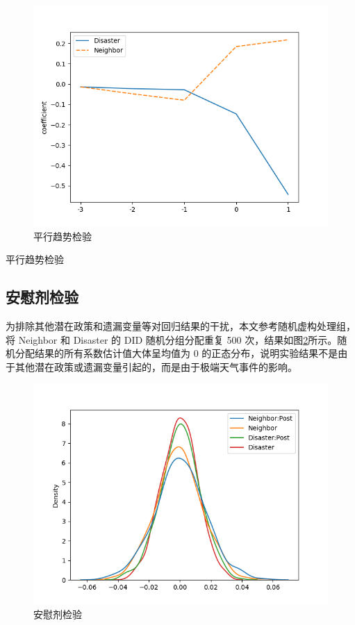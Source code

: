 \begin{figure}[H]
    \includegraphics[width=\linewidth]{lib/img/robust.png}
    \caption{平行趋势检验}\label{fig:robust}
\end{figure}
\begin{table}[H]
    \centering
    \caption{平行趋势检验}\label{tab:robust}
    
\end{table}

\subsection{安慰剂检验}
为排除其他潜在政策和遗漏变量等对回归结果的干扰，本文参考\citet{CYJJ202104009}随机虚构处理组，将 Neighbor 和 Disaster 的 DID 随机分组分配重复 500 次，结果如图\ref{fig:randomtest}所示。随机分配结果的所有系数估计值大体呈均值为 0 的正态分布，说明实验结果不是由于其他潜在政策或遗漏变量引起的，而是由于极端天气事件的影响。
\begin{figure}[H]
    \includegraphics[width=\linewidth]{lib/img/randomtest.png}
    \caption{安慰剂检验}\label{fig:randomtest}
\end{figure}

